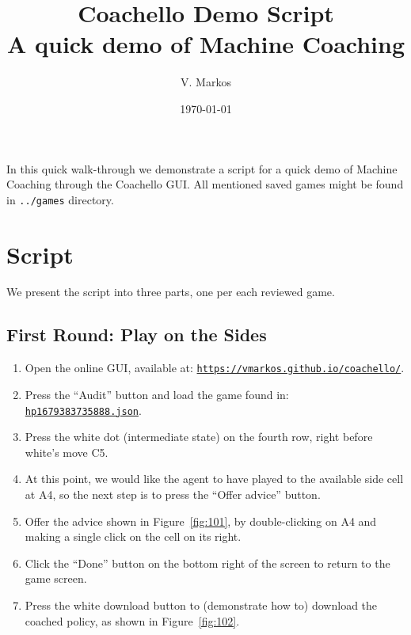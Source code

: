 \documentclass[a4paper,11pt]{article}
\title{\sffamily\LARGE\textbf{Coachello Demo Script}\\\Large A quick demo of Machine Coaching}
\author{\sffamily V. Markos}
\date{\sffamily\today}
\renewenvironment{abstract}
{\small
	\begin{center}
		\sffamily\bfseries \abstractname\vspace{-.5em}\vspace{0pt}
	\end{center}
	\list{}{%
		\setlength{\leftmargin}{35mm}
		\setlength{\rightmargin}{\leftmargin}%
	}%
	\item\relax}
{\endlist}
\theoremstyle{definition}
\theoremstyle{remark}
\numberwithin{equation}{section}
\begin{document}
	\maketitle
	
	\begin{abstract}
		In this quick walk-through we demonstrate a script for a quick demo of Machine Coaching through the Coachello GUI. All mentioned saved games might be found in \texttt{../games} directory.
	\end{abstract}

	\section{Script}\label{sec:Script}
	We present the script into three parts, one per each reviewed game.
	\subsection{First Round: Play on the Sides}\label{subsec:First Round}
	\begin{enumerate}
		\item Open the online GUI, available at: \href{https://vmarkos.github.io/coachello/}{\texttt{https://vmarkos.github.io/coachello/}}.
		\item Press the ``Audit'' button and load the game found in:  \href{../games/hp_36_27_1679383735888.json}{\texttt{hp\textunderscore 1679383735888.json}}.
	\end{enumerate}
	\begin{minipage}[c]{0.6\textwidth}
		\begin{enumerate}
			\setcounter{enumi}{2}
			\item Press the white dot (intermediate state) on the fourth row, right before white's move C5.			
			\item At this point, we would like the agent to have played to the available side cell at A4, so the next step is to press the ``Offer advice'' button.
			\item Offer the advice shown in Figure~\ref{fig:101}, by double-clicking on A4 and making a single click on the cell on its right.
			\item Click the ``Done'' button on the bottom right of the screen to return to the game screen.
			\item Press the white download button to (demonstrate how to) download the coached policy, as shown in Figure~\ref{fig:102}.
		\end{enumerate}
	\end{minipage}\hfill
\end{document}
